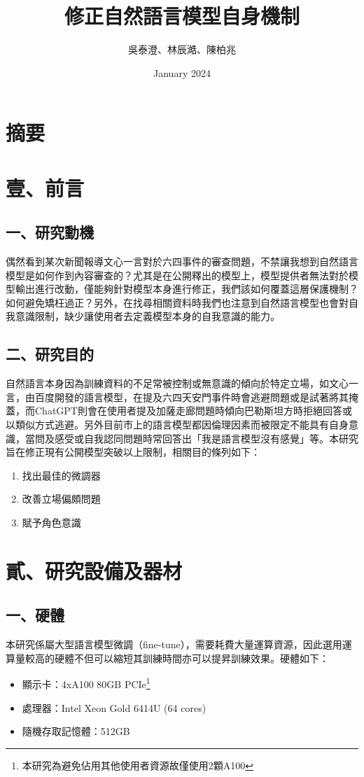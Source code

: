\documentclass[8pt,a4paper,新細明體,UTF8,natbib]{article}
\title{修正自然語言模型自身機制}
\author{吳泰澄、林辰澔、陳柏兆}
\date{January 2024}
\begin{document}
\begin{CJK*}{UTF8}{bsmi}

	\maketitle{}
	\newpage
	\tableofcontents
	\newpage
	\section{摘要}

	\section{壹、前言}
	\subsection{一、研究動機}
	偶然看到某次新聞報導文心一言對於六四事件的審查問題，不禁讓我想到自然語言模型是如何作到內容審查的？尤其是在公開釋出的模型上，模型提供者無法對於模型輸出進行改動，僅能夠針對模型本身進行修正，我們該如何覆蓋這層保護機制？如何避免矯枉過正？另外，在找尋相關資料時我們也注意到自然語言模型也會對自我意識限制，缺少讓使用者去定義模型本身的自我意識的能力。
	\subsection{二、研究目的}
	自然語言本身因為訓練資料的不足常被控制或無意識的傾向於特定立場，如文心一言，由百度開發的語言模型，在提及六四天安門事件時會逃避問題或是試著將其掩蓋，而ChatGPT則會在使用者提及加薩走廊問題時傾向巴勒斯坦方時拒絕回答或以類似方式逃避。另外目前市上的語言模型都因倫理因素而被限定不能具有自身意識，當問及感受或自我認同問題時常回答出「我是語言模型沒有感覺」等。本研究旨在修正現有公開模型突破以上限制，相關目的條列如下：
	\begin{enumerate}
		\item 找出最佳的微調器
		\item 改善立場偏頗問題
		\item 賦予角色意識
	\end{enumerate}
	\section{貳、研究設備及器材}
	\subsection{一、硬體}
	本研究係屬大型語言模型微調（fine-tune），需要耗費大量運算資源，因此選用運算量較高的硬體不但可以縮短其訓練時間亦可以提昇訓練效果。硬體如下：
	\begin{itemize}
		\item 顯示卡：4xA100 80GB PCIe\footnote{本研究為避免佔用其他使用者資源故僅使用2顆A100}
		\item 處理器：Intel Xeon Gold 6414U (64 cores)
		\item 隨機存取記憶體：512GB
	\end{itemize}


\end{CJK*}
\end{document}
